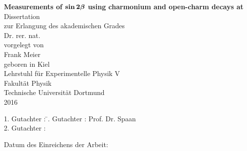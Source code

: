 
\thispagestyle{empty}
\vspace*{4.0cm}

\begin{center}
\Huge\textbf{
  Measurements of $\boldsymbol{\sin 2\beta}$ using charmonium and open-charm decays at \lhcb
}
\vfill
\Large
Dissertation \\ zur Erlangung des akademischen Grades \\ Dr. rer. nat. \\
\vspace{20pt}
\normalsize
vorgelegt von \\[5pt]
{\Large Frank Meier} \\[5pt]
geboren in Kiel \\
\vspace{20pt}
Lehrstuhl f\"ur Experimentelle Physik V \\ Fakult\"at Physik \\
Technische Universit\"at Dortmund \\ 2016

\end{center}
\newpage



\thispagestyle{empty}
\vspace*{\fill}
\begin{tabbing}
1. Gutachter : \=. Gutachter : \>Prof. Dr. Spaan \\[11pt]
2. Gutachter :
\end{tabbing}
\vspace{11pt}
Datum des Einreichens der Arbeit:
\newpage
